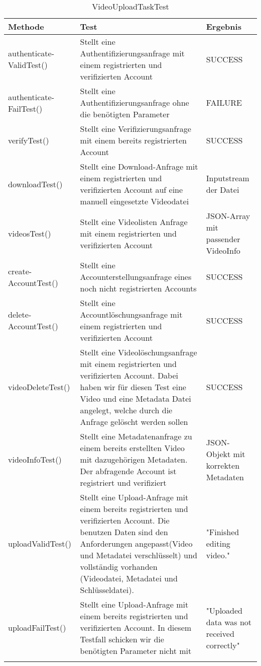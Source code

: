 \begin{longtable}{p{} | p{} | p{}}
\hline
  \textbf{Methode} & \textbf{Test} & \textbf{Ergebnis}\\
  \hline
   authenticate- \newline ValidTest() & Stellt eine Authentifizierungsanfrage mit einem registrierten und verifizierten Account & SUCCESS\\
  \hline
  authenticate- \newline FailTest() & Stellt eine Authentifizierungsanfrage ohne die benötigten Parameter & FAILURE \\
  \hline
  verifyTest() & Stellt eine Verifizierungsanfrage mit einem bereits registrierten Account & SUCCESS \\
  \hline
   downloadTest() & Stellt eine Download-Anfrage mit einem registrierten und verifizierten Account auf eine manuell eingesetzte Videodatei & Inputstream der Datei \\
  \hline
  videosTest() & Stellt eine Videolisten Anfrage mit einem registrierten und verifizierten Account & JSON-Array mit passender VideoInfo \\
  \hline
  create- \newline AccountTest() & Stellt eine Accounterstellungsanfrage eines noch nicht registrierten Accounts & SUCCESS \\
  \hline
  delete- \newline AccountTest() & Stellt eine Accountlöschungsanfrage mit einem registrierten und verifizierten Account & SUCCESS \\
  \hline
  videoDeleteTest() & Stellt eine Videolöschungsanfrage mit einem registrierten und verifizierten Account. Dabei haben wir für diesen Test eine Video und eine Metadata Datei angelegt, welche durch die Anfrage gelöscht werden sollen & SUCCESS \\
  \hline
  videoInfoTest() & Stellt eine Metadatenanfrage zu einem bereits erstellten Video mit dazugehörigen Metadaten. Der abfragende Account ist registriert und verifiziert & JSON-Objekt mit korrekten Metadaten \\
  \hline
  uploadValidTest() & Stellt eine Upload-Anfrage mit einem bereits registrierten und verifizierten Account. Die benutzen Daten sind den Anforderungen angepasst(Video und Metadatei verschlüsselt) und vollständig vorhanden (Videodatei, Metadatei und Schlüsseldatei). & "Finished editing video." \\
  \hline
  uploadFailTest() & Stellt eine Upload-Anfrage mit einem bereits registrierten und verifizierten Account. In diesem Testfall schicken wir die benötigten Parameter nicht mit & "Uploaded data was not received correctly" \\
  \hline
  \caption{VideoUploadTaskTest}
 \end{longtable}